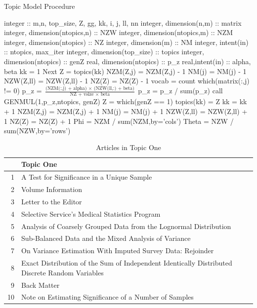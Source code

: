\documentclass{article}%
\theoremstyle{definition}
\begin{document}
\begin{algorithm}
\caption{Topic Model Procedure}\label{euclid}
\begin{algorithmic}[1]
\State {}
\State integer :: m,n, top\_size, Z, gg, kk, i, j, ll, nn
\State integer, dimension(n,m) :: matrix
\State integer, dimension(ntopics,n) :: NZW
\State integer, dimension(ntopics,m) :: NZM
\State integer, dimension(ntopics) :: NZ
\State integer, dimension(m) :: NM
\State integer, intent(in) :: ntopics, max\_iter
\State integer, dimension(top\_size) :: topics
\State integer, dimension(ntopics) :: genZ
\State real, dimension(ntopics) :: p\_z
\State real,intent(in) :: alpha, beta
\State {}
\State kk = 1
\State  {}
\State   {}
 Next
\EndIf
\State     {}
\State Z = topics(kk)
\State {}
\State NZM(Z,j) = NZM(Z,j) - 1
\State NM(j) = NM(j) - 1
\State NZW(Z,ll) = NZW(Z,ll) - 1
\State NZ(Z) = NZ(Z) - 1
\State
\State vocab = count which(matrix(:,j) != 0)
\State
\State p\_z = $\frac{\text{(NZM(:,j) + alpha) $\times$ (NZW(ll,:) + beta)}}{\text{NZ + vsize $\times$ beta}}$
\State
\State p\_z = p\_z / sum(p\_z)
\State {}
\State call GENMUL(1,p\_z,ntopics, genZ)
\State Z = which(genZ == 1)
\State  topics(kk) = Z
\State kk = kk + 1
\State {}
\State NZM(Z,j) = NZM(Z,j) + 1
\State NM(j) = NM(j) + 1
\State NZW(Z,ll) = NZW(Z,ll) + 1
\State NZ(Z) = NZ(Z) + 1
\State    \EndFor
\State   \EndFor
\State  \EndFor
\State \EndFor
\State Phi = NZM / sum(NZM,by='cols')
\State Theta = NZW / sum(NZW,by='rows')
\EndProcedure
\end{algorithmic}
\end{algorithm}


\begin{table}[ht]
\centering
\caption{Articles in Topic One}
\begin{tabular}{rl}
  \hline
 & Topic One \\ 
  \hline
1 & A Test for Significance in a Unique Sample \\ 
  2 & Volume Information \\ 
  3 & Letter to the Editor \\ 
  4 & Selective Service's Medical Statistics Program \\ 
  5 & Analysis of Coarsely Grouped Data from the Lognormal Distribution \\ 
  6 & Sub-Balanced Data and the Mixed Analysis of Variance \\ 
  7 & On Variance Estimation With Imputed Survey Data: Rejoinder \\ 
  8 & Exact Distribution of the Sum of Independent Identically Distributed Discrete Random Variables \\ 
  9 & Back Matter \\ 
  10 & Note on Estimating Significance of a Number of Samples \\ 
   \hline
\end{tabular}
\end{table}
\end{document}
